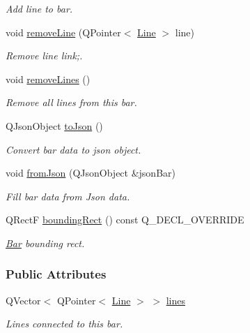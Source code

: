 \begin{DoxyCompactItemize}
\begin{DoxyCompactList}\small\item\em Add line to bar. \end{DoxyCompactList}\item 
void \hyperlink{group___models_gaec9faaf687415c27cd1d0527e1b94504}{remove\+Line} (Q\+Pointer$<$ \hyperlink{class_line}{Line} $>$ line)
\begin{DoxyCompactList}\small\item\em Remove line link;. \end{DoxyCompactList}\item 
void \hyperlink{group___models_ga4ea1a2074cb45968d80d6add571884a4}{remove\+Lines} ()
\begin{DoxyCompactList}\small\item\em Remove all lines from this bar. \end{DoxyCompactList}\item 
Q\+Json\+Object \hyperlink{group___models_ga3eb84c42b687db6cd98e11b8bd38c86e}{to\+Json} ()
\begin{DoxyCompactList}\small\item\em Convert bar data to json object. \end{DoxyCompactList}\item 
void \hyperlink{group___models_ga1df62f03dd3a066ceaf6588ba6bb6004}{from\+Json} (Q\+Json\+Object \&json\+Bar)
\begin{DoxyCompactList}\small\item\em Fill bar data from Json data. \end{DoxyCompactList}\item 
Q\+Rect\+F \hyperlink{group___models_ga8279d8109019cc7e139e2023690496be}{bounding\+Rect} () const Q\+\_\+\+D\+E\+C\+L\+\_\+\+O\+V\+E\+R\+R\+I\+D\+E
\begin{DoxyCompactList}\small\item\em \hyperlink{class_bar}{Bar} bounding rect. \end{DoxyCompactList}\end{DoxyCompactItemize}
\subsubsection*{Public Attributes}
\begin{DoxyCompactItemize}
\item 
Q\+Vector$<$ Q\+Pointer$<$ \hyperlink{class_line}{Line} $>$ $>$ \hyperlink{class_bar_a5aabf1f4ac22e20e9cb702a3a7e08eea}{lines}
\begin{DoxyCompactList}\small\item\em Lines connected to this bar. \end{DoxyCompactList}\end{DoxyCompactItemize}
